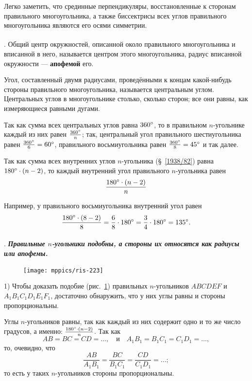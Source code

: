 \documentclass[twoside]{book}
\makeatletter
\newcommand{\rindex}[2][\imki@jobname]{%
  \index[#1]{\detokenize{#2}}%
}
\makeatother
\begin{document}
Легко заметить, что срединные перпендикуляры, восстановленные к сторонам правильного многоугольника, а также биссектрисы всех углов правильного многоугольника являются его осями симметрии.

\paragraph{}\label{1938/217}
.
Общий центр окружностей, описанной около правильного многоугольника и вписанной в него, называется центром этого многоугольника, радиус вписанной окружности — \rindex{апофема}\textbf{апофемой} его.

Угол, составленный двумя радиусами, проведёнными к концам какой-нибудь стороны правильного многоугольника, называется центральным углом.
Центральных углов в многоугольнике столько, сколько сторон;
все они равны, как измеряющиеся равными дугами.

Так как сумма всех центральных углов равна $360\degree$, то в правильном $n$-угольнике каждый из них равен $\tfrac{360\degree}n$;
так, центральный угол правильного шестиугольника равен $\tfrac{360\degree}6\z=60\degree$, правильного восьмиугольника равен $\tfrac{360\degree}8 = 45\degree$ и так далее.

Так как сумма всех внутренних углов $n$-угольника (§~\ref{1938/82}) равна $180\degree\cdot(n-2)$, то каждый внутренний угол правильного $n$-угольника равен
\[\frac{180\degree\cdot(n-2)}{n}\]

Например, у правильного восьмиугольника внутренний угол равен
\[\frac{180\degree\cdot(8-2)}{8}=\frac{6}{8}\cdot 180\degree=\frac{3}{4}\cdot 180\degree=135\degree.\]

\paragraph{}\label{1938/218}
.
\textbf{\emph{Правильные $n$-угольники подобны, а стороны их относятся как радиусы или апофемы.}}

\begin{figure}[h!]
\centering
\texttt{[image: mppics/ris-223]}
\caption{}\label{1938/ris-223}
\end{figure}

1) Чтобы доказать подобие (рис.~\ref{1938/ris-223}) правильных $n$-угольников $ABCDEF$ и $A_1B_1C_1D_1E_1F_1$, достаточно обнаружить, что у них углы равны и стороны пропорциональны.

Углы $n$-угольников равны, так как каждый из них содержит одно и то же число градусов, а именно: $\frac{180\degree\cdot(n-2)}{n}$.
Так как 
\[AB=BC = CD=\dots,
\quad\text{и}\quad A_1B_1=B_1C_1 = C_1D_1=\dots,\]
то, очевидно, что
\[\frac{AB}{A_1B_1}=\frac{BC}{B_1C_1} = \frac{CD}{C_1D_1}=\dots;\]
то есть у таких $n$-угольников стороны пропорциональны.
\end{document}
